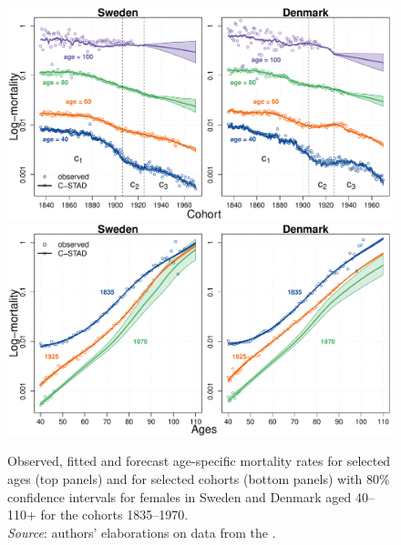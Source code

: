 \documentclass[11pt, a4paper]{article}
\begin{document}
\begin{figure}[h!]
	\begin{center}
		\includegraphics[scale=0.57]{./Figures/F7a.pdf} 
		\includegraphics[scale=0.57]{./Figures/F7b.pdf} 
		\caption{Observed, fitted and forecast age-specific mortality rates for selected ages (top panels) and for selected cohorts (bottom panels) with 80\% confidence intervals for females in Sweden and Denmark aged 40--110+ for the cohorts 1835--1970.\\ \small \textit{Source}: authors' elaborations on data from the \cite{HMD}.\label{Fig:CSTADforeMx}}    
	\end{center}
\end{figure}
\end{document}
